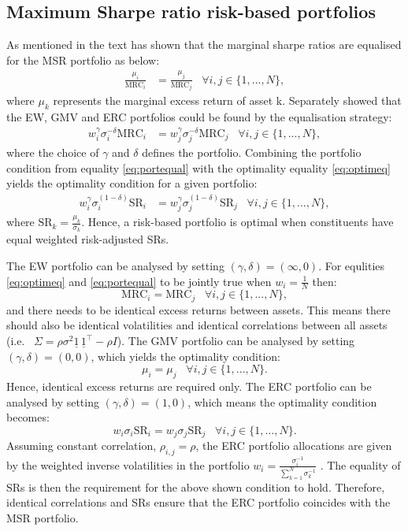 \documentclass[
]{article}
\begin{document}
\hypertarget{msrrbport}{%
\subsection{Maximum Sharpe ratio risk-based portfolios}\label{msrrbport}}

As mentioned in the text \citet{S07} has shown that the marginal sharpe ratios are equalised for the MSR
portfolio as below:
\begin{align}
\frac{\mu_i}{\text{MRC}_i} & = \frac{\mu_j}{\text{MRC}_j} \;\;\; \forall i, j \in \{1, ..., N \}, \label{eq:optimeq}
\end{align}
where \(\mu_k\) represents the marginal excess return of asset k. Separately \citet{J13} showed that the
EW, GMV and ERC portfolios could be found by the equalisation strategy:
\begin{align}
w_i^\gamma \sigma^{-\delta}_i \text{MRC}_i & = w_j^\gamma \sigma^{-\delta}_j \text{MRC}_j \;\;\; \forall i, j \in \{1, ..., N \}, \label{eq:portequal}
\end{align}
where the choice of \(\gamma\) and \(\delta\) defines the portfolio. Combining the portfolio condition
from equality \eqref{eq:portequal} with the optimality equality \eqref{eq:optimeq} yields the optimality
condition for a given portfolio:
\begin{align}
w_i^\gamma \sigma_i^{(1- \delta)} \text{SR}_i & = w_j^\gamma \sigma_j^{(1- \delta)} \text{SR}_j \;\;\; \forall i, j \in \{1, ..., N \},
\end{align}
where \(\text{SR}_k = \frac{\mu_k}{\sigma_k}\). Hence, a risk-based portfolio is optimal when
constituents have equal weighted risk-adjusted SRs.

The EW portfolio can be analysed by setting \((\gamma, \delta) = (\infty, 0)\). For equlities
\eqref{eq:optimeq} and \eqref{eq:portequal} to be jointly true when \(w_i = \frac{1}{N}\) then:
\[\text{MRC}_i = \text{MRC}_j \;\;\; \forall i, j \in \{1, ..., N \},\]
and there needs to be identical excess returns between assets. This means there should also be
identical volatilities and identical correlations between all assets (i.e.~
\(\Sigma = \rho\sigma^2 \underline{1} \,\underline{1}^\intercal - \rho I\)). The GMV portfolio can be
analysed by setting \((\gamma, \delta) = (0,0)\), which yields the optimality condition:
\[\mu_i = \mu_j \;\;\; \forall i, j \in \{1, ..., N \}.\]
Hence, identical excess returns are required only. The ERC portfolio can be analysed by setting
\((\gamma, \delta) = (1, 0)\), which means the optimality condition becomes:
\[w_i \sigma_i \text{SR}_i = w_j \sigma_j \text{SR}_j \;\;\; \forall i, j \in \{1, ..., N \}.\]
Assuming constant correlation, \(\rho_{i, j} = \rho\), the ERC portfolio allocations are given by the
weighted inverse volatilities in the portfolio \(w_i = \frac{\sigma^{-1}_i}{\sum_{k = 1}^N \sigma^{-1}_k}\) \citet{MRT10}. The equality of SRs is then the requirement for the above shown condition to
hold. Therefore, identical correlations and SRs ensure that the ERC portfolio coincides with the MSR
portfolio.
\end{document}
